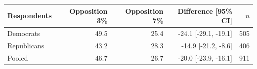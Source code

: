 \begin{tabular}{lrrrr}
\toprule
Respondents & Opposition 3\% & Opposition 7\% & Difference [95\% CI] & $n$ \\
\midrule
Democrats & 49.5 & 25.4 & -24.1 [-29.1, -19.1] & 505 \\
Republicans & 43.2 & 28.3 & -14.9 [-21.2, -8.6] & 406 \\
Pooled & 46.7 & 26.7 & -20.0 [-23.9, -16.1] & 911 \\
\bottomrule
\end{tabular}
